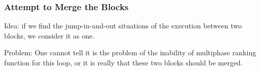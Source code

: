 \documentclass[11pt]{beamer}
\begin{document}
\begin{frame}\frametitle{Attempt to Merge the Blocks}
Idea: if we find the jump-in-and-out situations of the execution between two blocks, we consider it as one.

Problem: One cannot tell it is the problem of the inability of multiphase ranking function for this loop, or it is really that these two blocks should be merged.

\end{frame}
\end{document}
